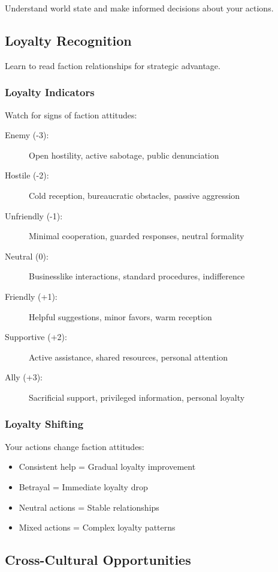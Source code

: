 Understand world state and make informed decisions about your actions.

\subsection{Loyalty Recognition}

Learn to read faction relationships for strategic advantage.

\subsubsection{Loyalty Indicators}

Watch for signs of faction attitudes:
\begin{description}
\item[Enemy (-3):] Open hostility, active sabotage, public denunciation
\item[Hostile (-2):] Cold reception, bureaucratic obstacles, passive aggression
\item[Unfriendly (-1):] Minimal cooperation, guarded responses, neutral formality
\item[Neutral (0):] Businesslike interactions, standard procedures, indifference
\item[Friendly (+1):] Helpful suggestions, minor favors, warm reception
\item[Supportive (+2):] Active assistance, shared resources, personal attention
\item[Ally (+3):] Sacrificial support, privileged information, personal loyalty
\end{description}

\subsubsection{Loyalty Shifting}

Your actions change faction attitudes:
\begin{itemize}
\item Consistent help = Gradual loyalty improvement
\item Betrayal = Immediate loyalty drop
\item Neutral actions = Stable relationships
\item Mixed actions = Complex loyalty patterns
\end{itemize}

\subsection{Cross-Cultural Opportunities}

